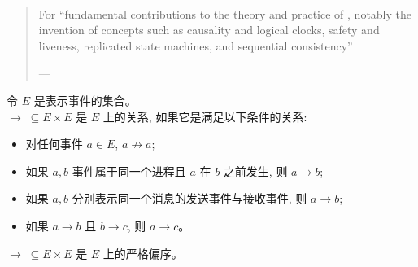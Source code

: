 
\begin{frame}{}

  \begin{center}
     \\[3pt]
  \end{center}

  \begin{quote}
    For ``fundamental contributions to the theory and practice of
      ,
      notably the invention of concepts
      such as causality and logical clocks,
      safety and liveness, replicated state machines,
      and sequential consistency''

    \hfill  --- 
  \end{quote}
\end{frame}

\begin{frame}{}
  \begin{center}
  \end{center}
\end{frame}

\begin{frame}{}
\end{frame}

\begin{frame}{}
  \begin{definition}
    令 $E$ 是表示事件的集合。\\[3pt]
    $\to \;\subseteq E \times E$ 是 $E$ 上的关系,
    如果它是满足以下条件的关系: \\[5pt]
    \begin{itemize}
      \setlength{\itemsep}{8pt}
      \item 对任何事件 $a \in E$, $a \not\to a$;
      \item 如果 $a, b$ 事件属于同一个进程且 $a$ 在 $b$ 之前发生, 则 $a \to b$;
      \item 如果 $a, b$ 分别表示同一个消息的发送事件与接收事件, 则 $a \to b$;
      \item 如果 $a \to b$ 且 $b \to c$, 则 $a \to c$。
    \end{itemize}
  \end{definition}

  \pause
  \vspace{0.30cm}
  \begin{theorem}
    $\to \;\subseteq E \times E$ 是 $E$ 上的严格偏序。
  \end{theorem}
\end{frame}
